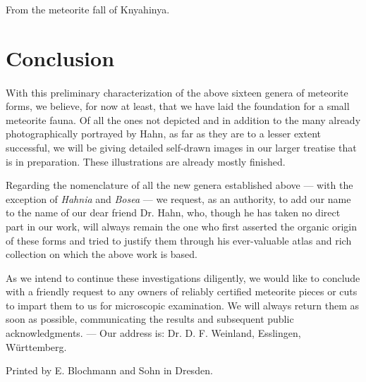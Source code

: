 \documentclass[a4paper, 12pt, oneside]{article}
\begin{document}
From the meteorite fall of Knyahinya.
\clearpage
\section{Conclusion}
\paragraph{}
With this preliminary characterization of the above sixteen genera of meteorite forms, we believe, for now at least, that we have laid the foundation for a small meteorite fauna. Of all the ones not depicted and in addition to the many already photographically portrayed by Hahn, as far as they are to a lesser extent successful, we will be giving detailed self-drawn images in our larger treatise that is in preparation. These illustrations are already mostly finished.

Regarding the nomenclature of all the new genera established above --- with the exception of \emph{Hahnia} and \emph{Bosea} --- we request, as an authority, to add our name to the name of our dear friend Dr. Hahn, who, though he has taken no direct part in our work, will always remain the one who first asserted the organic origin of these forms and tried to justify them through his ever-valuable atlas and rich collection on which the above work is based.

As we intend to continue these investigations diligently, we would like to conclude with a friendly request to any owners of reliably certified meteorite pieces or cuts to impart them to us for microscopic examination. We will always return them as soon as possible, communicating the results and subsequent public acknowledgments. --- Our address is: Dr. D. F. Weinland, Esslingen, Württemberg.

Printed by E. Blochmann and Sohn in Dresden.
\clearpage
\end{document}
